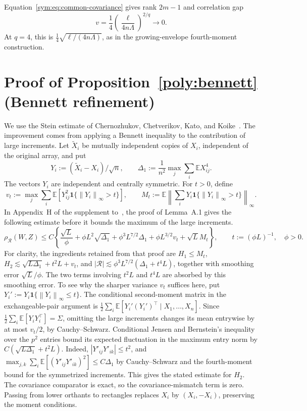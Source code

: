 \documentclass[11pt,letterpaper]{article}
\theoremstyle{remark}
\newcommand{\E}{\mathbb E}
\newcommand{\norm}[1]{\left\lVert#1\right\rVert}
\newcommand{\rh}{\rho_{\mathcal R}}
\newcommand{\ind}{\mathbf 1}
\begin{document}
Equation~\eqref{sym:eq:common-covariance} gives rank \(2m-1\)
and correlation gap
\[
 v=\frac14\left(\frac{\ell}{4n\Lambda}\right)^{2/q}\to0.
\]
At \(q=4\), this is
\(\frac14\sqrt{\ell/(4n\Lambda)}\), as in the growing-envelope
fourth-moment construction.

\section{Proof of Proposition~\ref*{poly:bennett} (Bennett refinement)}\label{app:bennett}

We use the Stein estimate of Chernozhukov, Chetverikov, Kato, and
Koike~\cite{CCKK2022}. The improvement comes from applying a Bennett
inequality to the contribution of large increments. Let \(\widetilde X_i\) be mutually
independent copies of \(X_i\), independent of the original array, and
put
\[
 Y_i:=(\widetilde X_i-X_i)/\sqrt n,\qquad
 \Delta_1:=\frac1{n^2}\max_j\sum_i\E X_{ij}^4.
\]
The vectors \(Y_i\) are independent and centrally symmetric. For \(t>0\),
define
\[
 v_t:=\max_j\sum_i\E[Y_{ij}^2\ind\{\norm{Y_i}_\infty>t\}],
 \qquad M_t:=\E\norm{\sum_iY_i\ind\{\norm{Y_i}_\infty>t\}}_\infty.
\]
In Appendix~H of the supplement to~\cite{CCKK2022}, the proof of
Lemma~A.1 gives the following estimate before it bounds the maximum of
the large increments.
\begin{equation}
 \rh(W,Z)\le C\left\{
 \frac{\sqrt L}{\phi}+\phi L^2\sqrt{\Delta_1}
 +\phi^3L^{7/2}\Delta_1+\phi L^{3/2}v_t+\sqrt L M_t\right\},
 \qquad t:=(\phi L)^{-1},\quad\phi>0.
 \label{ben:master}
\end{equation}
For clarity, the ingredients retained from that proof are
\(H_1\le M_t\),
\(H_2\lesssim\sqrt{L\Delta_1}+t^2L+v_t\), and
\(|\mathcal R|\lesssim\phi^3L^{7/2}(\Delta_1+t^4L)\), together
with smoothing error \(\sqrt L/\phi\). The two terms involving
\(t^2L\) and \(t^4L\) are absorbed by this smoothing error.
To see why the sharper variance $v_t$ suffices here, put
$Y_i':=Y_i\ind\{\norm{Y_i}_\infty\le t\}$. The conditional second-moment matrix
in the exchangeable-pair argument is
$\frac12\sum_i\E[Y_i'(Y_i')^\top\mid X_1,\ldots,X_n]$.
Since $\frac12\sum_i\E[Y_iY_i^\top]=\Sigma$, omitting the large
increments changes its mean entrywise by at most $v_t/2$, by
Cauchy--Schwarz. Conditional Jensen and Bernstein's inequality over
the $p^2$ entries bound its expected fluctuation in the maximum entry
norm by $C(\sqrt{L\Delta_1}+t^2L)$. Indeed,
$|Y'_{ij}Y'_{ik}|\le t^2$, and
$\max_{j,k}\sum_i\E[(Y'_{ij}Y'_{ik})^2]\le C\Delta_1$
by Cauchy--Schwarz and the fourth-moment bound for the symmetrized
increments. This gives the stated estimate for $H_2$.
The covariance comparator is exact, so the covariance-mismatch term
is zero. Passing from lower orthants to rectangles replaces \(X_i\)
by \((X_i,-X_i)\), preserving the moment conditions.
\end{document}
